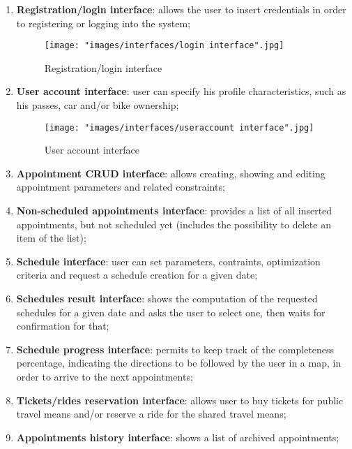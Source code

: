 \begin{enumerate}
\item \textbf{Registration/login interface}: allows the user to insert credentials in order to registering or logging into the system;
\begin{figure}[H]
\begin{center}
\texttt{[image: "images/interfaces/login interface".jpg]}
\caption{Registration/login interface}
\end{center}
\end{figure}
\item \textbf{User account interface}: user can specify his profile characteristics, such as his passes, car and/or bike ownership;
\begin{figure}[H]
\begin{center}
\texttt{[image: "images/interfaces/useraccount interface".jpg]}
\caption{User account interface}
\end{center}
\end{figure}
\item \textbf{Appointment CRUD interface}: allows creating, showing and editing appointment parameters and related constraints;
\item \textbf{Non-scheduled appointments interface}: provides a list of all inserted appointments, but not scheduled yet (includes the possibility to delete an item of the list);
\item \textbf{Schedule interface}: user can set parameters, contraints, optimization criteria and request a schedule creation for a given date;
\item \textbf{Schedules result interface}: shows the computation of the requested schedules for a given date and asks the user to select one, then waits for confirmation for that;
\item \textbf{Schedule progress interface}: permits to keep track of the completeness percentage, indicating the directions to be followed by the user in a map, in order to arrive to the next appointments;
\item \textbf{Tickets/rides reservation interface}: allows user to buy tickets for public travel means and/or reserve a ride for the shared travel means;
\item \textbf{Appointments history interface}: shows a list of archived appointments;
\end{enumerate}


